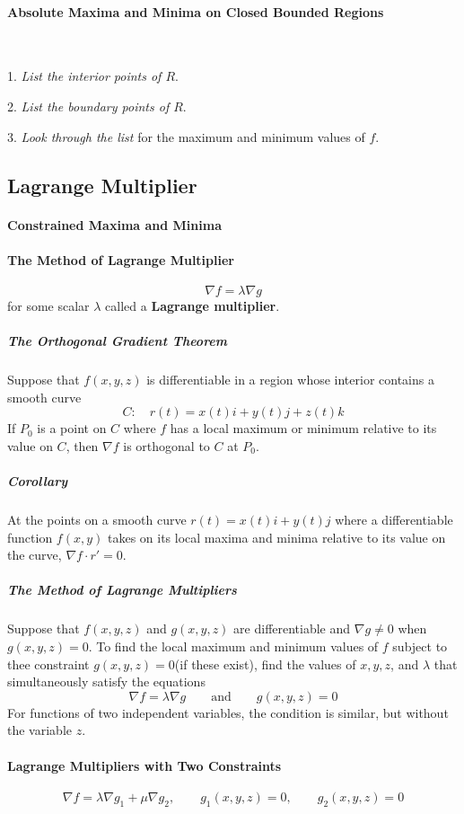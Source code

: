 \documentclass{article}
\begin{document}
            \paragraph{Absolute Maxima and Minima on Closed Bounded Regions}
                \text{}\\
                \par 1. \textit{List the interior points of $R$}.
                \par 2. \textit{List the boundary points of $R$}.
                \par 3. \textit{Look through the list} for the maximum and minimum values of $f$.
        \subsection{Lagrange Multiplier}
            \paragraph{Constrained Maxima and Minima}
            \paragraph{The Method of Lagrange Multiplier}
                \[\nabla f=\lambda \nabla g\]
                for some scalar $\lambda$ called a \textbf{Lagrange multiplier}.
                \subparagraph{The Orthogonal Gradient Theorem} Suppose that $f(x,y,z)$ is differentiable in a region whose interior contains a smooth curve
                \[C:\quad r(t)=x(t)i+y(t)j+z(t)k\]
                If $P_0$ is a point on $C$ where $f$ has a local maximum or minimum relative to its value on $C$, then $\nabla f$ is orthogonal to $C$ at $P_0$.
                \subparagraph{Corollary} At the points on a smooth curve $r(t)=x(t)i+y(t)j$ where a differentiable function $f(x,y)$ takes on its local maxima and minima relative to its value on the curve, $\nabla f\cdot r'=0$.
                \subparagraph{The Method of Lagrange Multipliers}
                    Suppose that $f(x,y,z)$ and $g(x,y,z)$ are differentiable and $\nabla g\ne 0$ when $g(x,y,z)=0$. To find the local maximum and minimum values of $f$ subject to thee constraint $g(x,y,z)=0$(if these exist), find the values of $x,y,z$, and $\lambda$ that simultaneously satisfy the equations 
                    \[\nabla f=\lambda\nabla g\qquad\text{and}\qquad g(x,y,z)=0\]
                    For functions of two independent variables, the condition is similar, but without the variable $z$.
            \paragraph{Lagrange Multipliers with Two Constraints}
                \[\nabla f=\lambda\nabla g_1+\mu\nabla g_2,\qquad g_1(x,y,z)=0,\qquad g_2(x,y,z)=0\]
\end{document}
